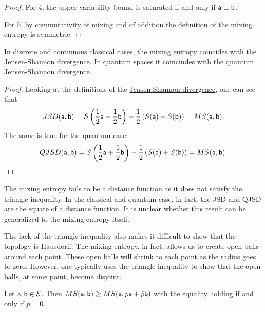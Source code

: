 \begin{mathSection}
\begin{proof}
	For 4, the upper variability bound is saturated if and only if $\ens[a] \ortho \ens[b]$.
	
	For 5, by commutativity of mixing and of addition the definition of the mixing entropy is symmetric.
\end{proof}

\begin{prop}
	In discrete and continuous classical cases, the mixing entropy coincides with the Jensen-Shannon divergence. In quantum spaces it coincindes with the quantum Jensen-Shannon divergence.
\end{prop}

\begin{proof}
	Looking at the definitions of the \href{https://en.wikipedia.org/wiki/Jensen%E2%80%93Shannon_divergence}{Jensen-Shannon divergence}, one can see that
	$$ JSD(\ens[a], \ens[b]) = S\left(\frac{1}{2}\ens[a] + \frac{1}{2}\ens[b] \right)  - \frac{1}{2} \left(S(\ens[a]) + S(\ens[b])\right) = MS(\ens[a], \ens[b]).$$
	The same is true for the quantum case:
	$$ QJSD(\ens[a], \ens[b]) = S\left(\frac{1}{2}\ens[a] + \frac{1}{2}\ens[b] \right)  - \frac{1}{2} \left(S(\ens[a]) + S(\ens[b])\right) = MS(\ens[a], \ens[b]).$$
\end{proof}

\begin{remark}
	The mixing entropy fails to be a distance function as it does not satisfy the triangle inequality. In the classical and quantum case, in fact, the JSD and QJSD are the square of a distance function. It is unclear whether this result can be generalized to the mixing entropy itself.
	
	The lack of the triangle inequality also makes it difficult to show that the topology is Hausdorff. The mixing entropy, in fact, allows us to create open balls around each point. These open balls will shrink to each point as the radius goes to zero. However, one typically uses the triangle inequality to show that the open balls, at some point, become disjoint.
\end{remark}
\end{mathSection}

\begin{prop}
	Let $\ens[a], \ens[b] \in \Ens$. Then $MS(\ens[a], \ens[b]) \geq MS(\ens[a], p\ens[a]+\bar{p}\ens[b])$ with the equality holding if and only if $p=0$.
\end{prop}

